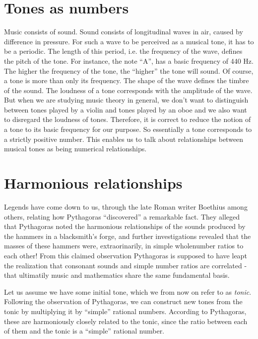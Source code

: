 \documentclass[a4paper]{book}
\theoremstyle{definition}
\begin{document}
\section{Tones as numbers}
Music consists of sound.
Sound consists of longitudinal waves in air, caused by difference in pressure.
For such a wave to be perceived as a musical tone, it has to be a periodic.
The length of this period, i.e. the frequency of the wave, defines the pitch of the tone.
For instance, the note ``A'', has a basic frequency of 440 Hz.
The higher the frequency of the tone, the ``higher'' the tone will sound.
Of course, a tone is more than only its frequency.
The shape of the wave defines the timbre of the sound.
The loudness of a tone corresponds with the amplitude of the wave.
But when we are studying music theory in general, we don't want to distinguish between tones played by a violin and tones played by an oboe and we also want to disregard the loudness of tones.
Therefore, it is correct to reduce the notion of a tone to its basic frequency for our purpose.
So essentially a tone corresponds to a strictly positive number.
This enables us to talk about relationships between musical tones as being numerical relationships.

\section{Harmonious relationships}
Legends have come down to us, through the late Roman writer Boethius among others, relating how Pythagoras ``discovered'' a remarkable fact.
They alleged that Pythagoras noted the harmonious relationships of the sounds produced by the hammers in a blacksmith's forge, and further investigations revealed that the masses of these hammers were, extraorinarily, in simple wholenumber ratios to each other!
From this claimed observation Pythagoras is supposed to have leapt the realization that consonant sounds and simple number ratios are correlated - that ultimatily music and mathematics share the same fundamental basis. \cite{NeilBibby}

Let us assume we have some initial tone, which we from now on refer to as \emph{tonic}.
Following the observation of Pythagoras, we can construct new tones from the tonic by multiplying it by ``simple'' rational numbers.
According to Pythagoras, these are harmoniously closely related to the tonic, since the ratio between each of them and the tonic is a ``simple'' rational number.
\end{document}

